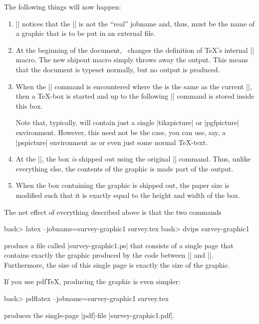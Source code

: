 The following things will now happen:
%
\begin{enumerate}
    \item |\pgfrealjobname| notices that the |\jobname| is not the ``real''
        jobname and, thus, must be the name of a graphic that is to be put in
        an external file.
    \item At the beginning of the document, \pgfname\ changes the definition of
        \TeX's internal |\shipout| macro. The new shipout macro simply throws
        away the output. This means that the document is typeset normally, but
        no output is produced.
    \item When the || command is
        encountered where the  is the same as the current
        |\jobname|, then a \TeX-box is started and  up to the
        following |\endpgfgraphicnamed| command is stored inside this box.

        Note that, typically,  will contain just a single
        |{tikzpicture}| or |{pgfpicture}| environment. However, this need not
        be the case, you can use, say, a |{pspicture}| environment as
         or even just some normal \TeX-text.
    \item At the |\endpgfgraphicnamed|, the box \emph{is} shipped out using the
        original |\shipout| command. Thus, unlike everything else, the contents
        of the graphic is made part of the output.
    \item When the box containing the graphic is shipped out, the paper size is
        modified such that it is exactly equal to the height and width of the
        box.
\end{enumerate}

The net effect of everything described above is that the two commands
%
\begin{codeexample}[code only, tikz syntax=false]
bash> latex --jobname=survey-graphic1 survey.tex
bash> dvips survey-graphic1
\end{codeexample}
%
\noindent produce a file called |survey-graphic1.ps| that consists of a single
page that contains exactly the graphic produced by the code between
|| and |\endpgfgraphicnamed|.
Furthermore, the size of this single page is exactly the size of the graphic.

If you use pdf\TeX, producing the graphic is even simpler:
%
\begin{codeexample}[code only, tikz syntax=false]
bash> pdflatex --jobname=survey-graphic1 survey.tex
\end{codeexample}
%
\noindent produces the single-page |pdf|-file |survey-graphic1.pdf|.


